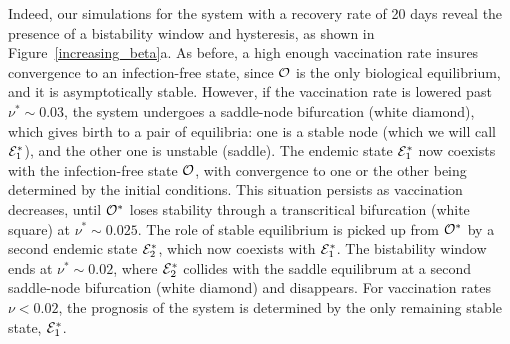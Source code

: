 \documentclass[10pt]{article}
\begin{document}
Indeed, our simulations for the system with a recovery rate of 20 days reveal the presence of a bistability window and hysteresis, as shown in Figure~\ref{increasing_beta}a. As before, a high enough vaccination rate insures convergence to an infection-free state, since ${\cal O}$ is the only biological equilibrium, and it is asymptotically stable. However, if the vaccination rate is lowered past $\nu^* \sim 0.03$, the system undergoes a saddle-node bifurcation (white diamond), which gives birth to a pair of equilibria: one is a stable node (which we will call ${\cal E}^*_1$), and the other one is unstable (saddle). The endemic state ${\cal E}^*_1$ now coexists with the infection-free state ${\cal O}$, with convergence to one or the other being determined by the initial conditions. This situation persists as vaccination decreases, until ${\cal O}^*$ loses stability through a transcritical bifurcation (white square) at $\nu^* \sim 0.025$. The role of stable equilibrium is picked up from ${\cal O}^*$ by a second endemic state ${\cal E}^*_2$, which now coexists with ${\cal E}^*_1$. The bistability window ends at $\nu^* \sim 0.02$, where ${\cal E}^*_2$ collides with the saddle equilibrum at a second saddle-node bifurcation (white diamond) and disappears. For vaccination rates $\nu<0.02$, the prognosis of the system is determined by the only remaining stable state, ${\cal E}^*_1$. 
\end{document}
